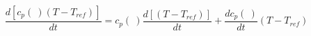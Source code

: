 \begin{equation}
\frac{d [c_p(\ ) (T- T_{ref})]}{dt} =c_p(\ ) \frac{d [ (T- T_{ref})]}{dt} + \frac{d c_p(\ )}{dt} (T- T_{ref})
\end{equation}